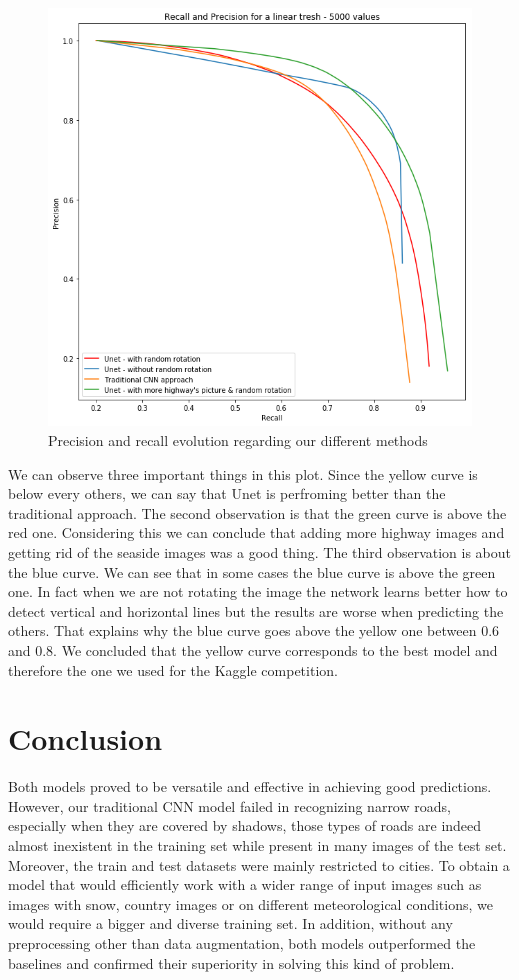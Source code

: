 \documentclass[10pt,conference,compsocconf]{IEEEtran}
\begin{document}
	\begin{figure}[h]
		\centering
		\includegraphics[width=0.8\columnwidth]{img/pr_curve.png}
		\caption{Precision and recall evolution regarding our different methods}
		\label{fig:pr}
	\end{figure}
	
	We can observe three important things in this plot. Since the yellow curve is below every others, we can say that Unet is perfroming better than the traditional approach. The second observation is that the green curve is above the red one. Considering this we can conclude that adding more highway images and getting rid of the seaside images was a good thing. The third observation is about the blue curve. We can see that in some cases the blue curve is above the green one. In fact when we are not rotating the image the network learns better how to detect vertical and horizontal lines but the results are worse when predicting the others. That explains why the blue curve goes above the yellow one between 0.6 and 0.8. We concluded that the yellow curve corresponds to the best model and therefore the one we used for the Kaggle competition.
	
\section{Conclusion}
\label{sec:conclusion}
Both models proved to be versatile and effective in achieving good predictions. However, our traditional CNN model failed in recognizing narrow roads, especially when they are covered by shadows, those types of roads are indeed almost inexistent in the training set while present in many images of the test set. Moreover, the train and test datasets were mainly restricted to cities. To obtain a model that would efficiently work with a wider range of input images such as images with snow, country images or on different meteorological conditions, we would require a bigger and diverse training set. In addition, without any preprocessing other than data augmentation, both models outperformed the baselines and confirmed their superiority in solving this kind of problem.




\end{document}
